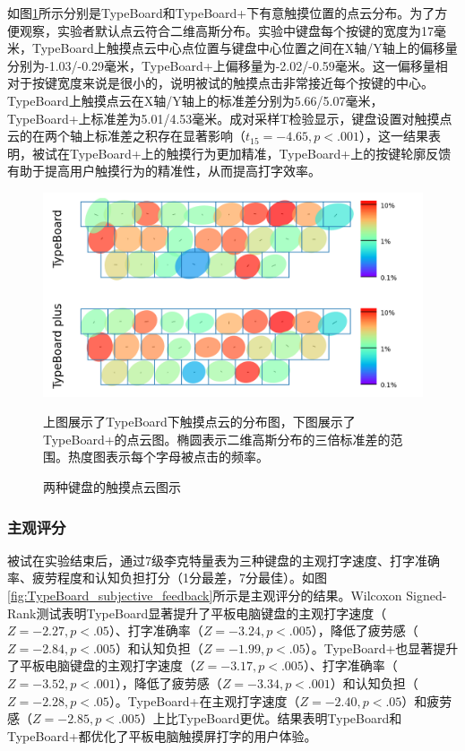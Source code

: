 如图\ref{fig:TypeBoard_touch_position}所示分别是TypeBoard和TypeBoard+下有意触摸位置的点云分布。为了方便观察，实验者默认点云符合二维高斯分布。实验中键盘每个按键的宽度为17毫米，TypeBoard上触摸点云中心点位置与键盘中心位置之间在X轴/Y轴上的偏移量分别为-1.03/-0.29毫米，TypeBoard+上偏移量为-2.02/-0.59毫米。这一偏移量相对于按键宽度来说是很小的，说明被试的触摸点击非常接近每个按键的中心。TypeBoard上触摸点云在X轴/Y轴上的标准差分别为5.66/5.07毫米，TypeBoard+上标准差为5.01/4.53毫米。成对采样T检验显示，键盘设置对触摸点云的在两个轴上标准差之积存在显著影响（$t_{15}=-4.65,p<.001$），这一结果表明，被试在TypeBoard+上的触摸行为更加精准，TypeBoard+上的按键轮廓反馈有助于提高用户触摸行为的精准性，从而提高打字效率。

\begin{figure}[!tbh]
	\includegraphics[width=1.0\linewidth]{figures/TypeBoard_touch_position.png}
	\centering
	\caption*{上图展示了TypeBoard下触摸点云的分布图，下图展示了TypeBoard+的点云图。椭圆表示二维高斯分布的三倍标准差的范围。热度图表示每个字母被点击的频率。}
	\caption{两种键盘的触摸点云图示}
	\label{fig:TypeBoard_touch_position}
\end{figure}

\subsubsection{主观评分}

被试在实验结束后，通过7级李克特量表为三种键盘的主观打字速度、打字准确率、疲劳程度和认知负担打分（1分最差，7分最佳）。如图\ref{fig:TypeBoard_subjective_feedback}所示是主观评分的结果。Wilcoxon Signed-Rank测试表明TypeBoard显著提升了平板电脑键盘的主观打字速度（$Z=-2.27,p<.05$）、打字准确率（$Z=-3.24,p<.005$），降低了疲劳感（$Z=-2.84,p<.005$）和认知负担（$Z=-1.99,p<.05$）。TypeBoard+也显著提升了平板电脑键盘的主观打字速度（$Z=-3.17,p<.005$）、打字准确率（$Z=-3.52,p<.001$），降低了疲劳感（$Z=-3.34,p<.001$）和认知负担（$Z=-2.28,p<.05$）。TypeBoard+在主观打字速度（$Z=-2.40,p<.05$）和疲劳感（$Z=-2.85,p<.005$）上比TypeBoard更优。结果表明TypeBoard和TypeBoard+都优化了平板电脑触摸屏打字的用户体验。

